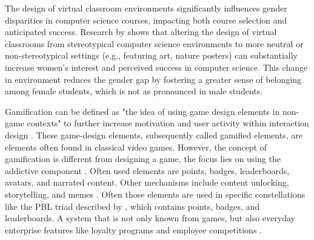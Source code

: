 The design of virtual classroom environments significantly influences gender disparities in computer science courses, impacting both course selection and anticipated success.
Research by \textcite{cheryanClassroomsMatterDesign2011} shows that altering the design of virtual classrooms from stereotypical computer science environments  to more neutral or non-stereotypical settings (e.g., featuring art, nature posters) can substantially increase women's interest and perceived success in computer science.
This change in environment reduces the gender gap by fostering a greater sense of belonging among female students, which is not as pronounced in male students.

Gamification can be defined as "the idea of using game design elements in non-game contexts" \parencite{deterdingGameDesignElements2011} to further increase motivation and user activity within interaction design \parencite{deterdingGameDesignElements2011}.
These game-design elements, subsequently called gamified elements, are elements often found in classical video games. However, the concept of gamification is different from designing a game, the focus lies on using the addictive component \parencite{gonzalezGamificationIntelligentTutoring2014}. Often used elements are points, badges, leaderboards, avatars, and narrated content. Other mechanisms include content unlocking, storytelling, and memes \parencite{zainuddinImpactGamificationLearning2020}.
Often those elements are used in specific constellations like the PBL triad described by \textcite{werbachWinHowGame2012}, which contains points, badges, and leaderboards.
A system that is not only known from games, but also everyday enterprise features like loyalty programs and employee competitions \parencite{werbachWinHowGame2012}.

